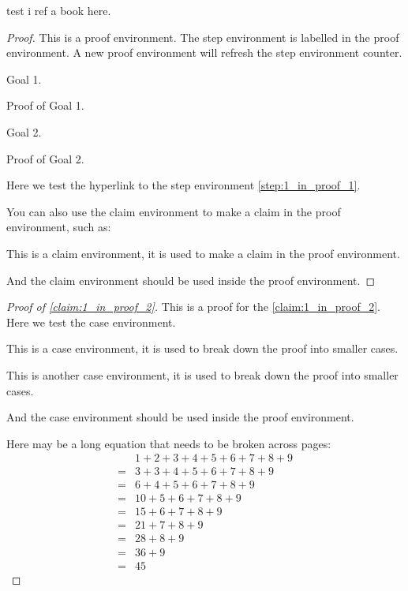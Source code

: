     \begin{theorem}
        test i ref a book \cite{FGA05} here.
    \end{theorem}
    \begin{proof}
        This is a proof environment.
        The step environment is labelled in the proof environment.
        A new proof environment will refresh the step environment counter.
        \begin{step}\label{step:1_in_proof_2}
            Goal 1.
        \end{step}
        Proof of Goal 1.
        
        \begin{step}\label{step:2_in_proof_2}
            Goal 2.
        \end{step}
        Proof of Goal 2.

        Here we test the hyperlink to the step environment \cref{step:1_in_proof_1}.

        You can also use the claim environment to make a claim in the proof environment, such as:
        \begin{claim}\label{claim:1_in_proof_2}
            This is a claim environment, it is used to make a claim in the proof environment.
        \end{claim}
        And the claim environment should be used inside the proof environment.
    \end{proof}
    \begin{proof}[Proof of \cref{claim:1_in_proof_2}]
        This is a proof for the \cref{claim:1_in_proof_2}.
        Here we test the case environment.
        \begin{case}\label{case:1_in_proof_2}
            This is a case environment, it is used to break down the proof into smaller cases.
        \end{case}
        \begin{case}\label{case:2_in_proof_2}
            This is another case environment, it is used to break down the proof into smaller cases.
        \end{case}
        And the case environment should be used inside the proof environment.
        
        Here may be a long equation that needs to be broken across pages:
        \begin{align*}
             & 1 + 2 + 3 + 4 + 5 + 6 + 7 + 8 + 9  \\
            = & 3 + 3 + 4 + 5 + 6 + 7 + 8 + 9  \\
            = & 6 + 4 + 5 + 6 + 7 + 8 + 9  \\
            = & 10 + 5 + 6 + 7 + 8 + 9  \\
            = & 15 + 6 + 7 + 8 + 9  \\
            = & 21 + 7 + 8 + 9  \\
            = & 28 + 8 + 9  \\
            = & 36 + 9  \\
            = & 45
        \end{align*}
    \end{proof}

